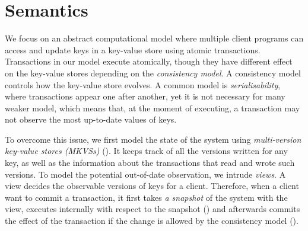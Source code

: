 \section{Semantics}
\label{sec:semantics}

We focus on an abstract computational model where multiple client programs can access and update keys in a key-value store using atomic transactions. 
Transactions in our model execute atomically, though they have different effect on the key-value stores depending on the \emph{consistency model}.
A consistency model controls how the key-value store evolves.
A common model is  \emph{serialisability}, where transactions appear one after another, yet it is not necessary for many weaker model, which means that, at the moment of executing, a transaction may not observe the most up-to-date values of keys. 

To overcome this issue, we first model the state of the system using \emph{multi-version key-value stores (MKVSs)} (). 
It keeps track of all the versions written for any key, as well as the information about the transactions that read and wrote such versions. 
To model the potential out-of-date observation, we intrude \emph{views}.
A view decides the observable versions of keys for a client.
Therefore, when a client want to commit a transaction, it first takes \emph{a snapshot} of the system with the view, executes internally with respect to the snapshot ()  and afterwards commits the effect of the transaction if the change is allowed by the consistency model ().








